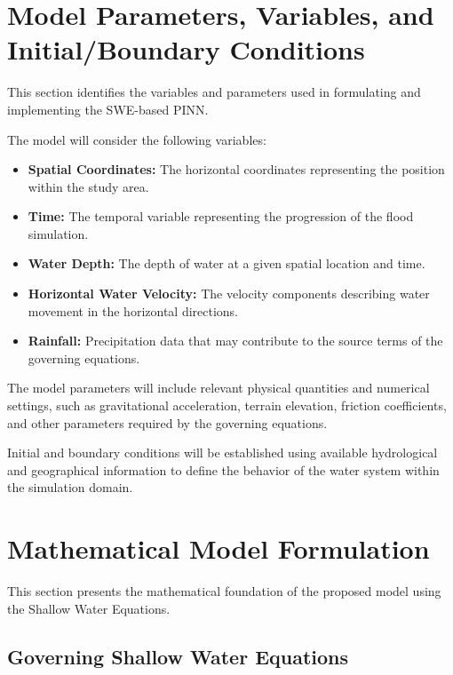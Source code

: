 \section{Model Parameters, Variables, and Initial/Boundary Conditions}

This section identifies the variables and parameters used in formulating and implementing the SWE-based PINN.

The model will consider the following variables:

\begin{itemize}
    \item \textbf{Spatial Coordinates:} The horizontal coordinates representing the position within the study area.
    
    \item \textbf{Time:} The temporal variable representing the progression of the flood simulation.
    
    \item \textbf{Water Depth:} The depth of water at a given spatial location and time.
    
    \item \textbf{Horizontal Water Velocity:} The velocity components describing water movement in the horizontal directions.
    
    \item \textbf{Rainfall:} Precipitation data that may contribute to the source terms of the governing equations.
\end{itemize}

The model parameters will include relevant physical quantities and numerical settings, such as gravitational acceleration, terrain elevation, friction coefficients, and other parameters required by the governing equations.

Initial and boundary conditions will be established using available hydrological and geographical information to define the behavior of the water system within the simulation domain.

\section{Mathematical Model Formulation}

This section presents the mathematical foundation of the proposed model using the Shallow Water Equations.

\subsection{Governing Shallow Water Equations}

